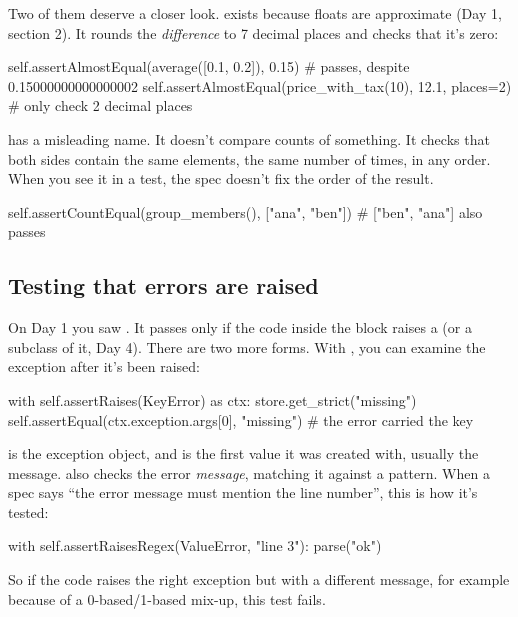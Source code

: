 \documentclass[10pt,a4paper]{article}
\begin{document}
Two of them deserve a closer look.
\textbf{} exists because floats are approximate (Day 1, section 2). It rounds the \emph{difference} to 7 decimal places and checks that it’s zero:
\begin{pycode}
self.assertAlmostEqual(average([0.1, 0.2]), 0.15)              # passes, despite 0.15000000000000002
self.assertAlmostEqual(price_with_tax(10), 12.1, places=2)    # only check 2 decimal places
\end{pycode}
\textbf{} has a misleading name. It doesn’t compare counts of something. It checks that both sides contain the same elements, the same number of times, in any order. When you see it in a test, the spec doesn’t fix the order of the result.
\begin{pycode}
self.assertCountEqual(group_members(), ["ana", "ben"])   # ["ben", "ana"] also passes
\end{pycode}
\subsection{Testing that errors are raised}
On Day 1 you saw . It passes only if the code inside the  block raises a  (or a subclass of it, Day 4). There are two more forms.
With , you can examine the exception after it’s been raised:
\begin{pycode}
with self.assertRaises(KeyError) as ctx:
    store.get_strict("missing")
self.assertEqual(ctx.exception.args[0], "missing")      # the error carried the key
\end{pycode}
 is the exception object, and  is the first value it was created with, usually the message.
 also checks the error \emph{message}, matching it against a pattern. When a spec says “the error message must mention the line number”, this is how it’s tested:
\begin{pycode}
with self.assertRaisesRegex(ValueError, "line 3"):
    parse("ok\nok\nbroken")
\end{pycode}
So if the code raises the right exception but with a different message, for example  because of a 0-based/1-based mix-up, this test fails.
\end{document}
